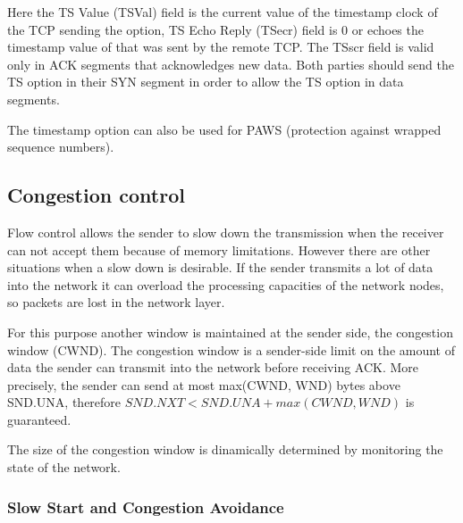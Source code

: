 Here the TS Value (TSVal) field is the current value of the timestamp
clock of the TCP sending the option, TS Echo Reply (TSecr) field is
0 or echoes the timestamp value of that was sent by the remote TCP.
The TSscr field is valid only in ACK segments that acknowledges new
data. Both parties should send the TS option in their SYN segment
in order to allow the TS option in data segments.

The timestamp option can also be used for PAWS (protection against wrapped
sequence numbers).


\subsection{Congestion control}

Flow control allows the sender to slow down the transmission when the
receiver can not accept them because of memory limitations. However
there are other situations when a slow down is desirable. If the sender
transmits a lot of data into the network it can overload the processing
capacities of the network nodes, so packets are lost in the network
layer.

For this purpose another window is maintained at the sender side, the
congestion window (CWND). The congestion window is a sender-side limit
on the amount of data the sender can transmit into the network before
receiving ACK. More precisely, the sender can send at most max(CWND, WND)
bytes above SND.UNA, therefore $ SND.NXT < SND.UNA + max(CWND, WND) $ is
guaranteed.

The size of the congestion window is dinamically determined by monitoring
the state of the network.

% 
% 


\subsubsection*{Slow Start and Congestion Avoidance}

